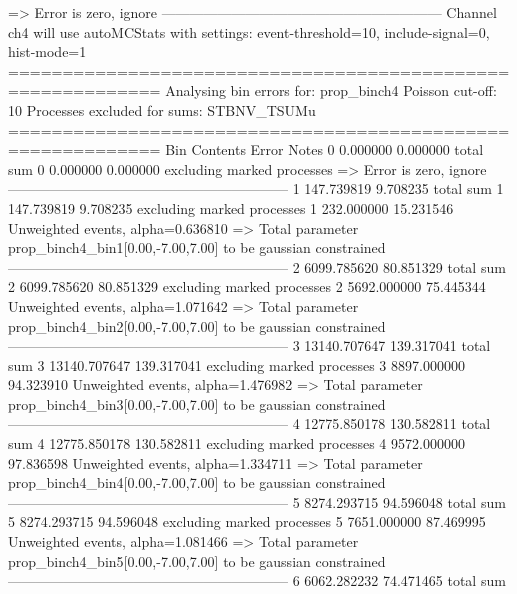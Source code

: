   => Error is zero, ignore      
------------------------------------------------------------
Channel ch4 will use autoMCStats with settings: event-threshold=10, include-signal=0, hist-mode=1
============================================================
Analysing bin errors for: prop_binch4
Poisson cut-off: 10
Processes excluded for sums: STBNV_TSUMu
============================================================
Bin        Contents        Error           Notes                         
0          0.000000        0.000000        total sum                     
0          0.000000        0.000000        excluding marked processes    
  => Error is zero, ignore      
------------------------------------------------------------
1          147.739819      9.708235        total sum                     
1          147.739819      9.708235        excluding marked processes    
1          232.000000      15.231546       Unweighted events, alpha=0.636810
  => Total parameter prop_binch4_bin1[0.00,-7.00,7.00] to be gaussian constrained
------------------------------------------------------------
2          6099.785620     80.851329       total sum                     
2          6099.785620     80.851329       excluding marked processes    
2          5692.000000     75.445344       Unweighted events, alpha=1.071642
  => Total parameter prop_binch4_bin2[0.00,-7.00,7.00] to be gaussian constrained
------------------------------------------------------------
3          13140.707647    139.317041      total sum                     
3          13140.707647    139.317041      excluding marked processes    
3          8897.000000     94.323910       Unweighted events, alpha=1.476982
  => Total parameter prop_binch4_bin3[0.00,-7.00,7.00] to be gaussian constrained
------------------------------------------------------------
4          12775.850178    130.582811      total sum                     
4          12775.850178    130.582811      excluding marked processes    
4          9572.000000     97.836598       Unweighted events, alpha=1.334711
  => Total parameter prop_binch4_bin4[0.00,-7.00,7.00] to be gaussian constrained
------------------------------------------------------------
5          8274.293715     94.596048       total sum                     
5          8274.293715     94.596048       excluding marked processes    
5          7651.000000     87.469995       Unweighted events, alpha=1.081466
  => Total parameter prop_binch4_bin5[0.00,-7.00,7.00] to be gaussian constrained
------------------------------------------------------------
6          6062.282232     74.471465       total sum                     

